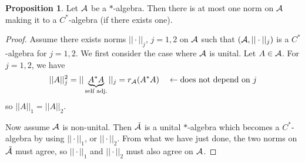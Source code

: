 \documentclass[10pt,english,a4paper]{article}
\theoremstyle{definition}
\newtheorem*{proposition}{Proposition}
\begin{document}
\begin{proposition}
    Let $\mathcal{A}$ be a $*$-algebra. Then there is at most one norm on $\mathcal{A}$ making
it to a $C^*$-algebra (if there exists one).
\end{proposition}
\begin{proof}
    Assume there exists norms $||\cdot||_{j}$, $j =1,2$ on $\mathcal{A}$ 
such that $(\mathcal{A},||\cdot||_{j})$ is a $C^*$-algebra for $j=1,2$.
We first consider the case where $\mathcal{A}$ is unital. Let $A \in \mathcal{A}$. For
$j=1,2$, we have 
\[
||A||_{j}^{2} = ||\underbrace{A^*A}_{\text{self adj.}}
||_{j} = r_{\mathcal{A}}(A^*A) \quad \leftarrow\text{does not depend on $j$}
\]
so $||A||_1 = ||A||_2$.

Now assume $\mathcal{A}$ is non-unital. Then $\tilde{\mathcal{A}}$ is a unital $*$-algebra which
becomes a $C^*$-algebra by using $||\cdot||_1$, or $||\cdot||_2$. From what we 
have just done, the two norms on $\tilde{\mathcal{A}}$ must agree, so $||\cdot||_1$ and 
$||\cdot||_2$ must also agree on $\mathcal{A}$.
\end{proof}
\end{document}
